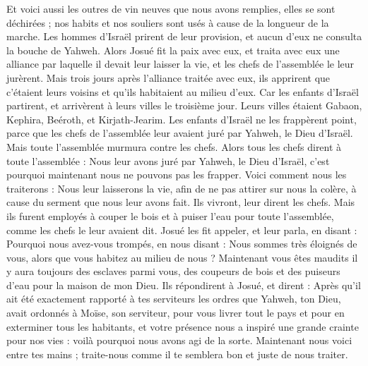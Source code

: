 \begin{multicols}{2}
Et voici aussi les outres de vin neuves que nous avons remplies, elles se sont déchirées ; nos habits et nos souliers sont usés à cause de la longueur de la marche.
Les hommes d’Israël prirent de leur provision, et aucun d’eux ne consulta la bouche de Yahweh.
Alors Josué fit la paix avec eux, et traita avec eux une alliance par laquelle il devait leur laisser la vie, et les chefs de l’assemblée le leur jurèrent.
Mais trois jours après l’alliance traitée avec eux, ils apprirent que c’étaient leurs voisins et qu’ils habitaient au milieu d’eux.
Car les enfants d’Israël partirent, et arrivèrent à leurs villes le troisième jour. Leurs villes étaient Gabaon, Kephira, Beéroth, et Kirjath-Jearim.
Les enfants d’Israël ne les frappèrent point, parce que les chefs de l’assemblée leur avaient juré par Yahweh, le Dieu d’Israël. Mais toute l’assemblée murmura contre les chefs.
Alors tous les chefs dirent à toute l’assemblée : Nous leur avons juré par Yahweh, le Dieu d’Israël, c’est pourquoi maintenant nous ne pouvons pas les frapper.
Voici comment nous les traiterons : Nous leur laisserons la vie, afin de ne pas attirer sur nous la colère, à cause du serment que nous leur avons fait.
Ils vivront, leur dirent les chefs. Mais ils furent employés à couper le bois et à puiser l’eau pour toute l’assemblée, comme les chefs le leur avaient dit.
Josué les fit appeler, et leur parla, en disant : Pourquoi nous avez-vous trompés, en nous disant : Nous sommes très éloignés de vous, alors que vous habitez au milieu de nous ?
Maintenant vous êtes maudits il y aura toujours des esclaves parmi vous, des coupeurs de bois et des puiseurs d’eau pour la maison de mon Dieu.
Ils répondirent à Josué, et dirent : Après qu’il ait été exactement rapporté à tes serviteurs les ordres que Yahweh, ton Dieu, avait ordonnés à Moïse, son serviteur, pour vous livrer tout le pays et pour en exterminer tous les habitants, et votre présence nous a inspiré une grande crainte pour nos vies : voilà pourquoi nous avons agi de la sorte.
Maintenant nous voici entre tes mains ; traite-nous comme il te semblera bon et juste de nous traiter.

\end{multicols}
